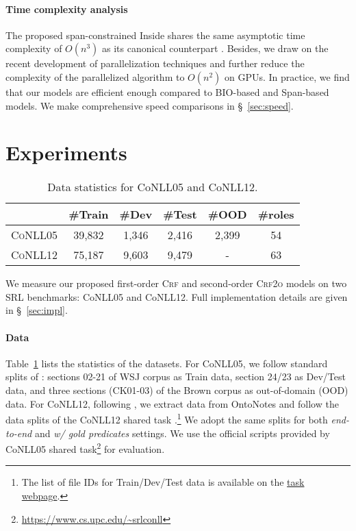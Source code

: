 \documentclass[11pt]{article}
\begin{document}
\paragraph{Time complexity analysis}
The proposed span-constrained Inside shares the same asymptotic time complexity of $O(n^3)$ as its canonical counterpart \cite{eisner-2000-bilexical}.
Besides, we draw on the recent development of parallelization techniques \cite{eisner-2016-inside,zhang-etal-2020-efficient,rush-2020-torch} and further reduce the complexity of the parallelized algorithm to $O(n^2)$ on GPUs.
In practice, we find that our models are efficient enough compared to BIO-based and Span-based models.
We make comprehensive speed comparisons in \S~\ref{sec:speed}.

\section{Experiments}\label{sec:exp}

\begin{table}[tb!]
    \renewcommand{\arraystretch}{1.1}
    \setlength{\tabcolsep}{5pt}
    \centering
    \begin{small}
        \begin{tabular}{l cccc|c}
            \toprule
            \rowcolor[gray]{0.95} & \#Train & \#Dev & \#Test & \#OOD & \#roles \\
            \midrule
            \textsc{CoNLL05}      & 39,832  & 1,346 & 2,416  & 2,399 & 54      \\
            \textsc{CoNLL12}      & 75,187  & 9,603 & 9,479  & -     & 63      \\
            \bottomrule
        \end{tabular}
        \caption{Data statistics for CoNLL05 and CoNLL12.}
        \label{table:statistics}
    \end{small}
\end{table}

We measure our proposed first-order \textsc{Crf} and second-order \textsc{Crf2o} models on two SRL benchmarks: CoNLL05 and CoNLL12.
Full implementation details are given in \S~\ref{sec:impl}.
\paragraph{Data}
Table~\ref{table:statistics} lists the statistics of the datasets.
For CoNLL05, we follow standard splits of \citet{carreras-marquez-2005-introduction}: sections 02-21 of WSJ corpus as Train data, section 24/23 as Dev/Test data, and three sections (CK01-03) of the Brown corpus as out-of-domain (OOD) data.
For CoNLL12, following \citet{he-etal-2018-jointly}, we extract data from OntoNotes \cite{pradhan-etal-2013-towards} and follow the data splits of the CoNLL12 shared task \cite{pradhan-etal-2012-conll}.\footnote{The list of file IDs for Train/Dev/Test data is available on the \href{https://cemantix.org/conll/2012/download/ids/english/coref/}{task webpage}.}
We adopt the same splits for both \emph{end-to-end} and \emph{w/ gold predicates} settings.
We use the official scripts provided by CoNLL05 shared task\footnote{\url{https://www.cs.upc.edu/~srlconll}} for evaluation.
\end{document}
